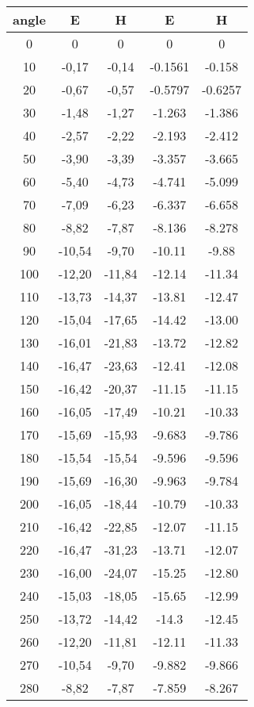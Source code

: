 \begin{table*}[!ht]
\begin{tabular}{|c|c|c|c|c|}
angle & E & H & E & H \\ \hline
0 & 0 & 0 & 0  & 0 \\ \hline
10 & -0,17 & -0,14 & -0.1561 & -0.158 \\ \hline
20 & -0,67 & -0,57 & -0.5797 & -0.6257 \\ \hline
30 & -1,48 & -1,27 & -1.263 & -1.386 \\ \hline
40 & -2,57 & -2,22 & -2.193 & -2.412 \\ \hline
50 & -3,90 & -3,39 & -3.357 & -3.665 \\ \hline
60 & -5,40 & -4,73 & -4.741 & -5.099 \\ \hline
70 & -7,09 & -6,23 & -6.337 & -6.658 \\ \hline
80 & -8,82 & -7,87 & -8.136 & -8.278 \\ \hline
90 & -10,54 & -9,70 & -10.11 & -9.88 \\ \hline
100 & -12,20 & -11,84 & -12.14 & -11.34 \\ \hline
110 & -13,73 & -14,37 & -13.81 & -12.47 \\ \hline
120 & -15,04 & -17,65 & -14.42 & -13.00 \\ \hline
130 & -16,01 & -21,83 & -13.72 & -12.82 \\ \hline
140 & -16,47 & -23,63 & -12.41 & -12.08 \\ \hline
150 & -16,42 & -20,37 & -11.15 & -11.15 \\ \hline
160 & -16,05 & -17,49 & -10.21 & -10.33 \\ \hline
170 & -15,69 & -15,93 & -9.683 & -9.786 \\ \hline
180 & -15,54 & -15,54 & -9.596 & -9.596 \\ \hline
190 & -15,69 & -16,30 & -9.963 & -9.784 \\ \hline
200 & -16,05 & -18,44 & -10.79 & -10.33 \\ \hline
210 & -16,42 & -22,85 & -12.07 & -11.15 \\ \hline
220 & -16,47 & -31,23 & -13.71 & -12.07 \\ \hline
230 & -16,00 & -24,07 & -15.25 & -12.80 \\ \hline
240 & -15,03 & -18,05 & -15.65 & -12.99 \\ \hline
250 & -13,72 & -14,42 & -14.3 & -12.45 \\ \hline
260 & -12,20 & -11,81 & -12.11 & -11.33 \\ \hline
270 & -10,54 & -9,70 & -9.882 & -9.866 \\ \hline
280 & -8,82 & -7,87 & -7.859 & -8.267 \\ \hline

\end{tabular}
\end{table*}
